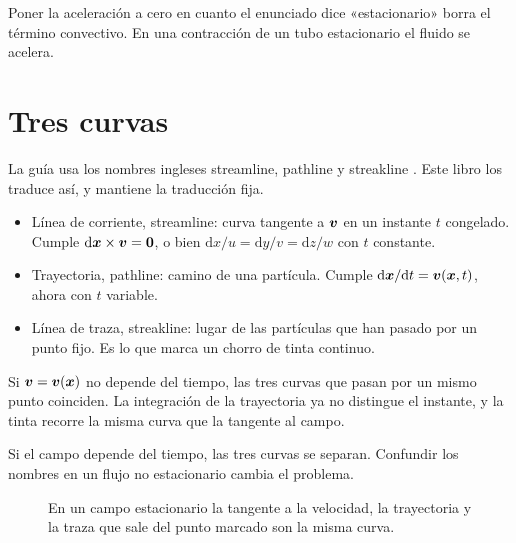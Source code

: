 \begin{errorbox}
Poner la aceleración a cero en cuanto el enunciado dice «estacionario» borra el término convectivo. En una contracción de un tubo estacionario el fluido se acelera.
\end{errorbox}

\section{Tres curvas}

La guía usa los nombres ingleses streamline, pathline y streakline \parencite{uleGuia2026}. Este libro los traduce así, y mantiene la traducción fija.

\begin{itemize}[leftmargin=1.2em]
\item Línea de corriente, streamline: curva tangente a \(\boldsymbol{v}\) en un instante \(t\) congelado. Cumple \(\mathrm{d}\boldsymbol{x}\times\boldsymbol{v}=\boldsymbol{0}\), o bien \(\mathrm{d}x/u=\mathrm{d}y/v=\mathrm{d}z/w\) con \(t\) constante.
\item Trayectoria, pathline: camino de una partícula. Cumple \(\mathrm{d}\boldsymbol{x}/\mathrm{d}t=\boldsymbol{v}(\boldsymbol{x},t)\), ahora con \(t\) variable.
\item Línea de traza, streakline: lugar de las partículas que han pasado por un punto fijo. Es lo que marca un chorro de tinta continuo.
\end{itemize}

\begin{theorembox}
Si \(\boldsymbol{v}=\boldsymbol{v}(\boldsymbol{x})\) no depende del tiempo, las tres curvas que pasan por un mismo punto coinciden. La integración de la trayectoria ya no distingue el instante, y la tinta recorre la misma curva que la tangente al campo.
\end{theorembox}

Si el campo depende del tiempo, las tres curvas se separan. Confundir los nombres en un flujo no estacionario cambia el problema.

\begin{figure}[ht]
\centering
{}
\caption{En un campo estacionario la tangente a la velocidad, la trayectoria y la traza que sale del punto marcado son la misma curva.}
\label{fig:streamline}
\end{figure}

